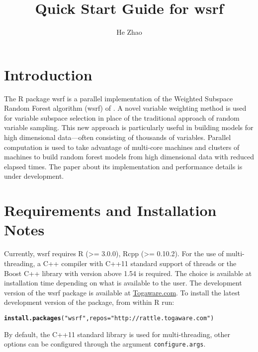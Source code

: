 \documentclass[11pt,a4paper]{article}\usepackage{graphicx, color}
\makeatletter
\newcommand{\hlfunctioncall}[1]{\textcolor[rgb]{0.501960784313725,0,0.329411764705882}{\textbf{#1}}}%
\newcommand{\hlstring}[1]{\textcolor[rgb]{0.6,0.6,1}{#1}}%
\newenvironment{kframe}{%
 \def\at@end@of@kframe{}%
 \ifinner\ifhmode%
  \def\at@end@of@kframe{\end{minipage}}%
  \begin{minipage}{\columnwidth}%
 \fi\fi%
 \def\FrameCommand##1{\hskip\@totalleftmargin \hskip-\fboxsep
 \colorbox{shadecolor}{##1}\hskip-\fboxsep
     \hskip-\linewidth \hskip-\@totalleftmargin \hskip\columnwidth}%
 \MakeFramed {\advance\hsize-\width
   \@totalleftmargin\z@ \linewidth\hsize
   \@setminipage}}%
 {\par\unskip\endMakeFramed%
 \at@end@of@kframe}
\newenvironment{knitrout}{}{} %
\newcommand{\proglang}[1]{\textsf{#1}}
\newcommand{\code}[1]{\texttt{#1}}
\newcommand{\pkg}[1]{{\fontseries{b}\selectfont #1}}
\makeatother
\begin{document}
\title{Quick Start Guide for \pkg{wsrf}}
\author{He Zhao}
\maketitle


\section{Introduction}

The \proglang{R} package \pkg{wsrf} is a parallel implementation of
the Weighted Subspace Random Forest algorithm (wsrf) of
\cite{xu2012classifying}.  A novel variable weighting method is used
for variable subspace selection in place of the traditional approach
of random variable sampling.  This new approach is particularly useful
in building models for high dimensional data---often consisting of
thousands of variables.  Parallel computation is used to take
advantage of multi-core machines and clusters of machines to build
random forest models from high dimensional data with reduced elapsed
times.  The paper about its implementation and performance details is
under development.

\section{Requirements and Installation Notes}

Currently, \pkg{wsrf} requires R (>= 3.0.0), Rcpp (>= 0.10.2).  For
the use of multi-threading, a \proglang{C++} compiler with
\proglang{C++11} standard support of threads or the Boost
\proglang{C++} library \citep{Boost} with version above 1.54 is
required. The choice is available at installation time depending on
what is available to the user.  The development version of the
\pkg{wsrf} package is available at
\href{http://rattle.togaware.com/}{Togaware.com}.  To install the
latest development version of the package, from within \proglang{R}
run:

\begin{knitrout}
\color{fgcolor}\begin{kframe}
\begin{alltt}
\hlfunctioncall{install.packages}(\hlstring{"wsrf"}, repos=\hlstring{"http://rattle.togaware.com"})
\end{alltt}
\end{kframe}
\end{knitrout}


By default, the C++11 standard library is used for multi-threading,
other options can be configured through the argument
\code{configure.args}.
\end{document}
